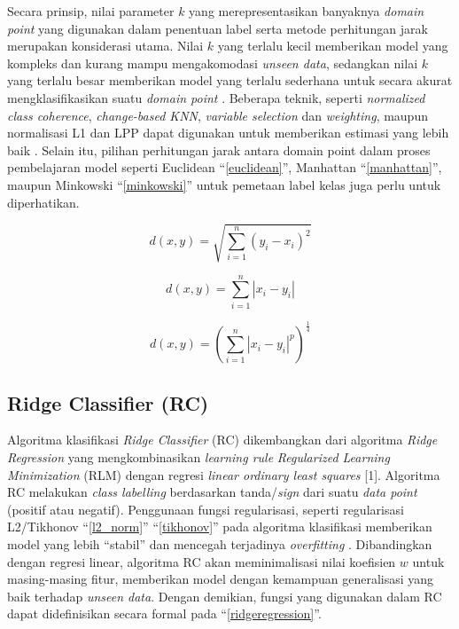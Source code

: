 \documentclass[conference]{IEEEtran}
\begin{document}
Secara prinsip, nilai parameter $k$ yang merepresentasikan banyaknya \textit{domain point} yang digunakan 
dalam penentuan label serta metode perhitungan jarak merupakan konsiderasi utama. Nilai $k$ yang
terlalu kecil memberikan model yang kompleks dan kurang mampu mengakomodasi \textit{unseen data}, sedangkan 
nilai $k$ yang terlalu besar memberikan model yang terlalu sederhana untuk secara akurat 
mengklasifikasikan suatu \textit{domain point} \cite{b9}. Beberapa teknik, seperti \textit{normalized class coherence}, 
\textit{change-based KNN}, \textit{variable selection} dan \textit{weighting}, maupun normalisasi L1 dan LPP dapat digunakan untuk 
memberikan estimasi yang lebih baik \cite{b10,b11,b12}. Selain itu, pilihan perhitungan jarak antara domain point 
dalam proses pembelajaran model seperti Euclidean ``\eqref{euclidean}'', Manhattan ``\eqref{manhattan}'', maupun Minkowski ``\eqref{minkowski}'' untuk pemetaan label kelas 
juga perlu untuk diperhatikan.

\begin{equation}
    d(x, y)=\sqrt{\sum_{i=1}^{n} (y_i - x_i)^2} \label{euclidean}
\end{equation}

\begin{equation}
    d(x,y) = \sum_{i=1}^{n}|x_i - y_i| \label{manhattan}
\end{equation}

\begin{equation}
    d(x, y) = (\sum_{i=1}^{n} |x_i - y_i|^p)^{\frac{1}{4}} \label{minkowski}
\end{equation}

\subsection{Ridge Classifier (RC)}

Algoritma klasifikasi \textit{Ridge Classifier} (RC) dikembangkan dari algoritma \textit{Ridge Regression} yang mengkombinasikan 
\textit{learning rule} \textit{Regularized Learning Minimization} (RLM) dengan regresi \textit{linear ordinary least squares} [1]. 
Algoritma RC melakukan \textit{class labelling} berdasarkan tanda/\textit{sign} dari suatu \textit{data point} (positif atau negatif). 
Penggunaan fungsi regularisasi, seperti regularisasi L2/Tikhonov ``\eqref{l2_norm}'' ``\eqref{tikhonov}'' pada algoritma klasifikasi memberikan model yang lebih “stabil” 
dan mencegah terjadinya \textit{overfitting} \cite{b4, b5}. Dibandingkan dengan regresi linear, algoritma RC akan meminimalisasi nilai 
koefisien $w$ untuk masing-masing fitur, memberikan model dengan kemampuan generalisasi yang baik terhadap \textit{unseen data}. Dengan demikian, fungsi
yang digunakan dalam RC dapat didefinisikan secara formal pada ``\eqref{ridgeregression}''.
\end{document}
